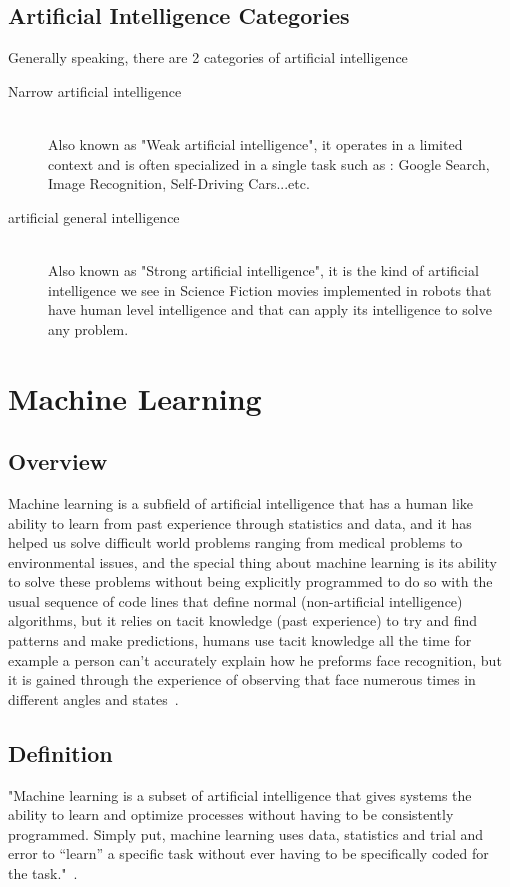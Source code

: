     \subsection{Artificial Intelligence Categories}
        Generally speaking, there are 2 categories of artificial intelligence ~\cite{ai}

            \begin{description} 
            \item[Narrow artificial intelligence] \hfill \\
                Also known as "Weak artificial intelligence", it operates in a limited context and is often specialized in a single task such as : Google Search, Image Recognition, Self-Driving Cars...etc.
            \item[artificial general intelligence] \hfill \\
                Also known as "Strong artificial intelligence", it is the kind of artificial intelligence we see in Science Fiction movies implemented in robots that have human level intelligence and that can apply its intelligence to solve any problem.
            \end{description}
\section{Machine Learning}
    \subsection{Overview}
        Machine learning is a subfield of artificial intelligence that has a human like ability to learn from past experience through statistics and data, and it has helped us solve difficult world problems ranging from medical problems to environmental issues, and the special thing about machine learning is its ability to solve these problems without being explicitly programmed to do so with the usual sequence of code lines that define normal (non-artificial intelligence) algorithms, but it relies on tacit knowledge (past experience) to try and find patterns and make predictions, humans use tacit knowledge all the time for example a person can't accurately explain how he preforms face recognition, but it is gained through the experience of observing that face numerous times in different angles and states~\cite{ml}.

    \subsection{Definition}
        "Machine learning is a subset of artificial intelligence that gives systems the ability to learn and optimize processes without having to be consistently programmed. Simply put, machine learning uses data, statistics and trial and error to “learn” a specific task without ever having to be specifically coded for the task."~\cite{ml}.

